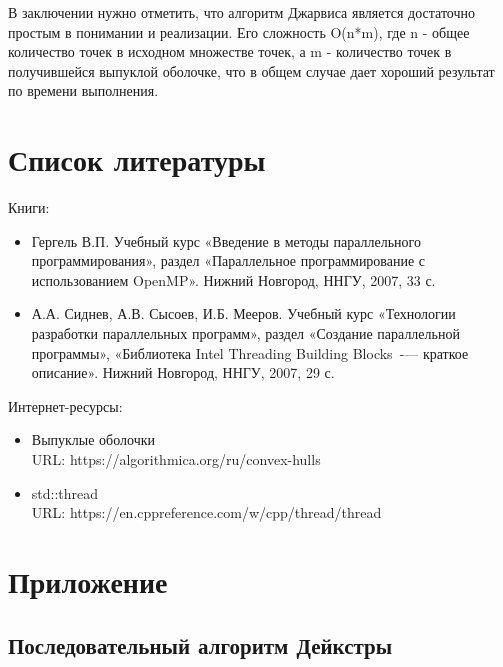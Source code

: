 \documentclass{article}
\begin{document}
\par В заключении нужно отметить, что алгоритм Джарвиса является достаточно простым в понимании и реализации. Его сложность O(n*m), где n - общее количество точек в исходном множестве точек, а m - количество точек в получившейся выпуклой оболочке, что в общем случае дает хороший результат по времени выполнения.
\newpage

\section{Список литературы}
Книги:

\begin{itemize}
\item Гергель В.П. Учебный курс «Введение в методы параллельного программирования», раздел «Параллельное программирование с использованием OpenMP». Нижний Новгород, ННГУ, 2007, 33 с.
\item А.А. Сиднев, А.В. Сысоев, И.Б. Мееров. Учебный курс «Технологии разработки параллельных программ», раздел «Создание параллельной программы», «Библиотека Intel Threading Building Blocks~-— краткое описание». Нижний Новгород, ННГУ, 2007, 29 с.
\end{itemize}

\par Интернет-ресурсы:

\begin{itemize}
\item Выпуклые оболочки \\ URL: https://algorithmica.org/ru/convex-hulls
\item std::thread \\ URL: https://en.cppreference.com/w/cpp/thread/thread
\end{itemize}

\newpage

\section{Приложение}
\subsection{Последовательный алгоритм Дейкстры}



\end{document}
